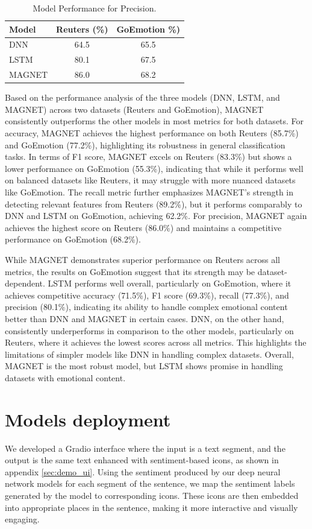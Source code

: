 \documentclass{article}
\begin{document}
\begin{table}[h!]
    \centering
    \begin{tabular}{l|c|c}
         \textbf{Model} & \textbf{Reuters (\%)} & \textbf{GoEmotion \%)} \\
         \hline
         DNN  & 64.5 & 65.5 \\
         LSTM  & 80.1 & 67.5 \\
         MAGNET  & 86.0 & 68.2 \\
    \end{tabular}
    \caption{Model Performance for Precision.} 
    \label{tab:model_performance_comparison}
\end{table}
\FloatBarrier
Based on the performance analysis of the three models (DNN, LSTM, and MAGNET) across two datasets (Reuters and GoEmotion), MAGNET consistently outperforms the other models in most metrics for both datasets. For accuracy, MAGNET achieves the highest performance on both Reuters (85.7\%) and GoEmotion (77.2\%), highlighting its robustness in general classification tasks. In terms of F1 score, MAGNET excels on Reuters (83.3\%) but shows a lower performance on GoEmotion (55.3\%), indicating that while it performs well on balanced datasets like Reuters, it may struggle with more nuanced datasets like GoEmotion. The recall metric further emphasizes MAGNET's strength in detecting relevant features from Reuters (89.2\%), but it performs comparably to DNN and LSTM on GoEmotion, achieving 62.2\%. For precision, MAGNET again achieves the highest score on Reuters (86.0\%) and maintains a competitive performance on GoEmotion (68.2\%).

While MAGNET demonstrates superior performance on Reuters across all metrics, the results on GoEmotion suggest that its strength may be dataset-dependent. LSTM performs well overall, particularly on GoEmotion, where it achieves competitive accuracy (71.5\%), F1 score (69.3\%), recall (77.3\%), and precision (80.1\%), indicating its ability to handle complex emotional content better than DNN and MAGNET in certain cases. DNN, on the other hand, consistently underperforms in comparison to the other models, particularly on Reuters, where it achieves the lowest scores across all metrics. This highlights the limitations of simpler models like DNN in handling complex datasets. Overall, MAGNET is the most robust model, but LSTM shows promise in handling datasets with emotional content.
\section{Models deployment}
We developed a Gradio interface where the input is a text segment, and the output is the same text enhanced with sentiment-based icons, as shown in appendix \ref{sec:demo_ui}. Using the sentiment produced by our deep neural network models for each segment of the sentence, we map the sentiment labels generated by the model to corresponding icons. These icons are then embedded into appropriate places in the sentence, making it more interactive and visually engaging.
\end{document}
